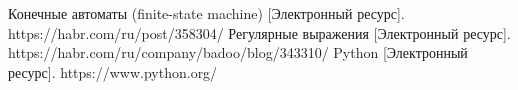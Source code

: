 \documentclass[12pt, a4paper]{report}
\begin{document}
	\newpage
	
	\begin{thebibliography}{}
	 Конечные автоматы (finite-state machine) [Электронный ресурс]. https://habr.com/ru/post/358304/
	 Регулярные выражения [Электронный ресурс].  https://habr.com/ru/company/badoo/blog/343310/
	 Python [Электронный ресурс]. https://www.python.org/
	\end{thebibliography}
\end{document}
